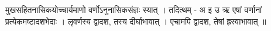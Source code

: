 मुखसहितनासिकयोच्चार्यमाणो वर्णोऽनुनासिकसंज्ञः स्यात् । तदित्थम् - अ इ उ
ऋ एषां वर्णानां प्रत्येकमष्टादशभेदाः । लृवर्णस्य द्वादश, तस्य
दीर्घाभावात् । एचामपि द्वादश, तेषां ह्रस्वाभावात् ॥
